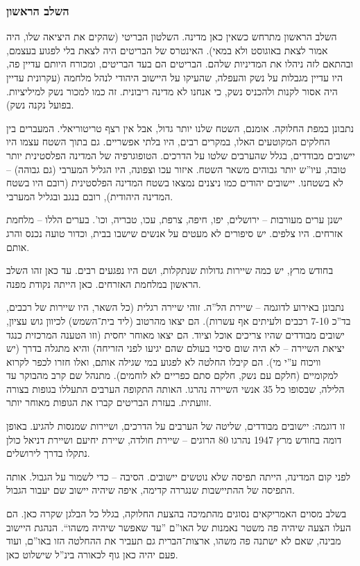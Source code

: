 \documentclass[]{../../../../tex/classes/styledArticle}
\begin{document}
	\subsubsection*{השלב הראשון}
	השלב הראשון מתרחש כשאין כאן מדינה. השלטון הבריטי (שהקים את היציאה שלו, היה אמור לצאת באוגוסט ולא במאי). האינטרס של הבריטים היה לצאת בלי לפגוע בעצמם, ובהתאם לזה ניהלו את המדיניות שלהם. הבריטים הם בעד הבריטים, ומכורח היותם עדיין פה, היו עדיין מגבלות על נשק והעפלה, שהעיקו על היישוב היהודי לנהל מלחמה (עקרונית עדיין היה אסור לקנות ולהכניס נשק, כי אנחנו לא מדינה ריבונית. זה כמו למכור נשק למיליציות. בפועל נקנה נשק). 
	
	נתבונן במפת החלוקה. אומנם, השטח שלנו יותר גדול, אבל אין רצף טריטוריאלי. המעברים בין החלקים המקוטעים האלו, במקרים רבים, היו בלתי אפשריים. גם בתוך השטח עצמו היו יישובים מבודדים, בגלל שהערבים שלטו על הדרכים. הטופוגרפיה של המדינה הפלסטינית יותר טובה, עיו''ש יותר גבוהים משאר השטח. איזור עכו וצפונה, היו הגליל המערבי (גם גבוהה) – לא בשטחנו. יישובים יהודים כמו ניצנים נמצאו בשטח המדינה הפלסטינית (רובם היו בשטח המדינה היהודית), רובם בנגב ובגליל המערבי. 
	
	ישנן ערים מעורבות – ירושלים, יפו, חיפה, צרפת, עכו, טבריה, וכו'. בערים הללו – מלחמת אזרחים. היו צלפים. יש סיפורים לא מעטים על אנשים שישבו בבית, וכדור טועה נכנס והרג אותם. 
	
	בחודש מרץ, יש כמה שיירות גדולות שנתקלות, ושם היו נפגעים רבים. עד כאן זהו השלב הראשון במלחמת האזרחים. כאן הייתה נקודת מפנה. 
	
	נתבונן באירוע לדוגמה – שיירת הל''ה. זוהי שיירה רגלית (כל השאר, היו שיירות של רכבים, בד''כ 7-10 רכבים ולעיתים אף עשרות). הם יצאו מהרטוב (ליד בית־השמש) לכיוון גוש עציון, ישובים מבודדים שהיו צריכים אוכל וציוד. הם יצאו מאוחר יחסית (וזו הטענה המרכזית כנגד יציאת השיירה – לא היה שום סיכוי בעולם שהם יגיעו לפני הזריחה) והיא מתגלה בדרך (יש וויכוח ע''י מי). הם קיבלו החלטה לא לפגוע במי שגילה אותם, ואלו חזרו לכפר לקרוא למקומיים (חלקם עם נשק, חלקם סתם כפריים לא לוחמים). מתנהל שם קרב מהבוקר עד הלילה, שבסופו כל 35 אנשי השיירה נהרגו. האותה התקופה הערבים התעללו בגופות בצורה זוועתית. בעזרת הבריטים קברו את הגופות מאוחר יותר. 
	
	זו דוגמה: יישובים מבודדים, שליטה של הערבים על הדרכים, ושיירות שמנסות להגיע. באופן דומה בחודש מרץ 1947 נהרגו 80 הרוגים – שיירת חולדה, שיירת יחיעם ושיירת דניאל כולן נתקלו בדרך לירושלים. 
	
	לפני קום המדינה, הייתה תפיסה שלא נוטשים יישובים. הסיבה – כדי לשמור על הגבול. אותה התפיסה של ההתיישבות שנגררה קדימה, איפה שיהיה יישוב שם יעבור הגבול. 
	
	בשלב מסוים האמריקאים נסוגים מהתמיכה בהצעת החלוקה, בגלל כל הבלגן שקרה כאן. הם העלו הצעה שיהיה פה משטר נאמנות של האו''ם ''עד שאפשר שיהיה משהו``. הנהגת היישוב מבינה, שאם לא ישתנה פה משהו, ארצות־הברית גם תעביר את ההחלטה הזו באו''ם, ועוד פעם יהיה כאן גוף לכאורה בינ''ל שישלוט כאן. 
	
\end{document}
